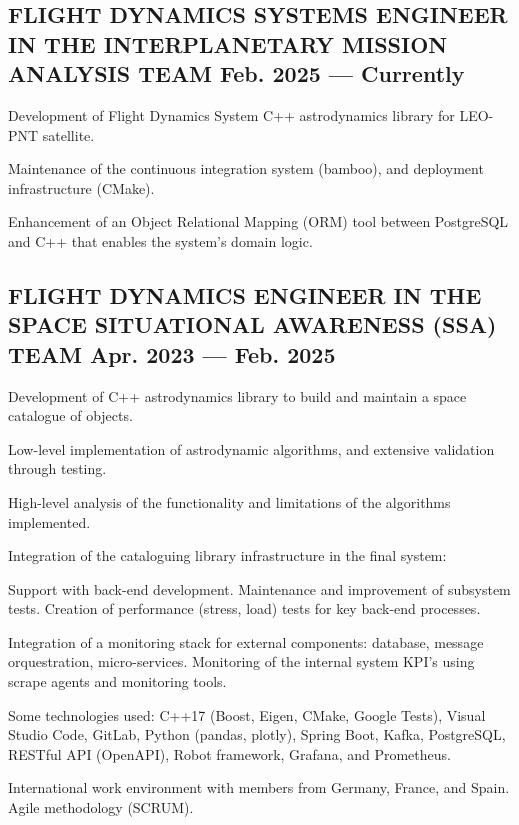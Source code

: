 \documentclass[letter,10pt]{article}
\begin{document}
\subsection{{FLIGHT DYNAMICS SYSTEMS ENGINEER IN THE INTERPLANETARY MISSION ANALYSIS TEAM \hfill Feb. 2025  --- Currently}}
\begin{zitemize}
\item Development of Flight Dynamics System C++ astrodynamics library for LEO-PNT satellite. 
\item Maintenance of the continuous integration system (bamboo), and deployment infrastructure (CMake).
\item Enhancement of an Object Relational Mapping (ORM) tool between PostgreSQL and C++ that enables the system's domain logic.
\end{zitemize}

\subsection{{FLIGHT DYNAMICS ENGINEER IN THE SPACE SITUATIONAL AWARENESS (SSA) TEAM \hfill Apr. 2023  --- Feb. 2025}}
\begin{zitemize}
\item Development of C++ astrodynamics library to build and maintain a space catalogue of objects.
\begin{zitemize}
    \item Low-level implementation of astrodynamic algorithms, and extensive validation through testing.
    \item High-level analysis of the functionality and limitations of the algorithms implemented.
\end{zitemize}
\item Integration of the cataloguing library infrastructure in the final system:
\begin{zitemize}
    \item Support with back-end development. Maintenance and improvement of subsystem tests. Creation of performance (stress, load) tests for key back-end processes. 
    \item Integration of a monitoring stack for external components: database, message orquestration, micro-services. Monitoring of the internal system KPI's using scrape agents and monitoring tools.
\end{zitemize}
\item Some technologies used: C++17 (Boost, Eigen, CMake, Google Tests), Visual Studio Code, GitLab, Python (pandas, plotly), Spring Boot, Kafka, PostgreSQL, RESTful API (OpenAPI), Robot framework, Grafana, and Prometheus.

\item International work environment with members from Germany, France, and Spain. Agile methodology (SCRUM).
\end{zitemize}
\end{document}
